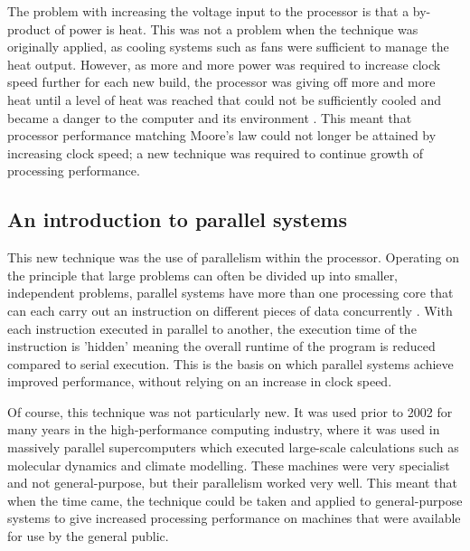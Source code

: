 \documentclass[a4paper, 12pt]{article}
\begin{document}
The problem with increasing the voltage input to the processor is that a by-product of power is heat. This was not a problem when the technique was originally applied, as cooling systems such as fans were sufficient to manage the heat output. However, as more and more power was required to increase clock speed further for each new build, the processor was giving off more and more heat until a level of heat was reached that could not be sufficiently cooled and became a danger to the computer and its environment \cite{Adv08}. This meant that processor performance matching Moore's law could not longer be attained by increasing clock speed; a new technique was required to continue growth of processing performance.

\subsection{An introduction to parallel systems}

This new technique was the use of parallelism within the processor. Operating on the principle that large problems can often be divided up into smaller, independent problems, parallel systems have more than one processing core that can each carry out an instruction on different pieces of data concurrently \cite{Got89}. With each instruction executed in parallel to another, the execution time of the instruction is 'hidden' meaning the overall runtime of the program is reduced compared to serial execution. This is the basis on which parallel systems achieve improved performance, without relying on an increase in clock speed.

Of course, this technique was not particularly new. It was used prior to 2002 for many years in the high-performance computing industry, where it was used in massively parallel supercomputers which executed large-scale calculations such as molecular dynamics and climate modelling. These machines were very specialist and not general-purpose, but their parallelism worked very well. This meant that when the time came, the technique could be taken and applied to general-purpose systems to give increased processing performance on machines that were available for use by the general public.
\end{document}
